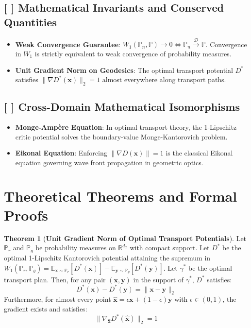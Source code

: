 \documentclass[11pt,a4paper]{article}
\theoremstyle{definition}
\newtheorem{theorem}{\textbf{Theorem}}[section]
\begin{document}
\subsection{[ ] Mathematical Invariants and Conserved Quantities}
\begin{itemize}
    \item \textbf{Weak Convergence Guarantee}: $W_1(\mathbb{P}_n, \mathbb{P}) \to 0 \Longleftrightarrow \mathbb{P}_n \xrightarrow{\mathcal{D}} \mathbb{P}$. Convergence in $W_1$ is strictly equivalent to weak convergence of probability measures.
    \item \textbf{Unit Gradient Norm on Geodesics}: The optimal transport potential $D^*$ satisfies $\|\nabla D^*(\mathbf{x})\|_2 = 1$ almost everywhere along transport paths.
\end{itemize}

\subsection{[ ] Cross-Domain Mathematical Isomorphisms}
\begin{itemize}
    \item \textbf{Monge-Ampère Equation}: In optimal transport theory, the 1-Lipschitz critic potential solves the boundary-value Monge-Kantorovich problem.
    \item \textbf{Eikonal Equation}: Enforcing $\|\nabla D(\mathbf{x})\| = 1$ is the classical Eikonal equation governing wave front propagation in geometric optics.
\end{itemize}

\section{Theoretical Theorems and Formal Proofs}

\begin{theorem}[\textbf{Unit Gradient Norm of Optimal Transport Potentials}]
Let $\mathbb{P}_r$ and $\mathbb{P}_g$ be probability measures on $\mathbb{R}^{d_x}$ with compact support. Let $D^*$ be the optimal 1-Lipschitz Kantorovich potential attaining the supremum in $W_1(\mathbb{P}_r, \mathbb{P}_g) = \mathbb{E}_{\mathbf{x} \sim \mathbb{P}_r}[D^*(\mathbf{x})] - \mathbb{E}_{\mathbf{y} \sim \mathbb{P}_g}[D^*(\mathbf{y})]$. Let $\gamma^*$ be the optimal transport plan. Then, for any pair $(\mathbf{x}, \mathbf{y})$ in the support of $\gamma^*$, $D^*$ satisfies:
{\boldmath
\begin{equation}
D^*(\mathbf{x}) - D^*(\mathbf{y}) = \|\mathbf{x} - \mathbf{y}\|_2
\end{equation}
}
Furthermore, for almost every point $\hat{\mathbf{x}} = \epsilon \mathbf{x} + (1 - \epsilon)\mathbf{y}$ with $\epsilon \in (0, 1)$, the gradient exists and satisfies:
{\boldmath
\begin{equation}
\|\nabla_{\hat{\mathbf{x}}} D^*(\hat{\mathbf{x}})\|_2 = 1
\end{equation}
}
\end{theorem}
\end{document}
